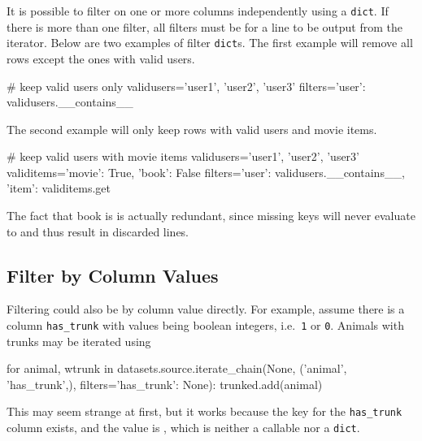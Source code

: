 It is possible to filter on one or more columns independently using a
\texttt{dict}.  If there is more than one filter, all filters must be
\pyTrue for a line to be output from the iterator.
Below are two examples of filter \texttt{dict}s.  The first example
will remove all rows except the ones with valid users.
\begin{python}
# keep valid users only
validusers={'user1', 'user2', 'user3'}
filters={'user': validusers.__contains__}
\end{python}
The second example will only keep rows with valid users and movie
items.
\begin{python}
# keep valid users with movie items
validusers={'user1', 'user2', 'user3'}
validitems={'movie': True, 'book': False}
filters={'user': validusers.__contains__, 'item': validitems.get}
\end{python}
The fact that book is \pyFalse is actually redundant, since
missing keys will never evaluate to \pyTrue and thus result in
discarded lines.




\subsection*{Filter by Column Values}

Filtering could also be by column value directly.  For example, assume
there is a column \texttt{has\_trunk} with values being boolean
integers, i.e.\ \texttt{1} or \texttt{0}.  Animals with trunks may be
iterated using
\begin{python}
for animal, wtrunk in datasets.source.iterate_chain(None,
                      ('animal', 'has_trunk',),
                      filters={'has_trunk': None}):
    trunked.add(animal)
\end{python}
This may seem strange at first, but it works because the key for
the \texttt{has\_trunk} column exists, and the value is
\pyNone, which is neither a callable nor a \texttt{dict}.




